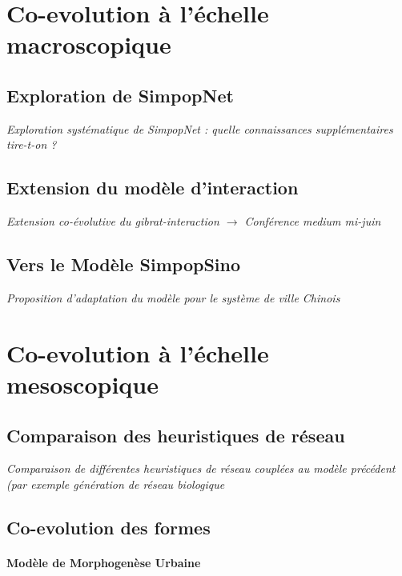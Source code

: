 \section{Co-evolution à l'échelle macroscopique}

\subsection{Exploration de SimpopNet}

\textit{Exploration systématique de SimpopNet : quelle connaissances supplémentaires tire-t-on ?}

\subsection{Extension du modèle d'interaction}


\textit{Extension co-évolutive du gibrat-interaction $\rightarrow$ Conférence medium mi-juin}


\subsection{Vers le Modèle SimpopSino}

\textit{Proposition d'adaptation du modèle pour le système de ville Chinois}





\section{Co-evolution à l'échelle mesoscopique}


\subsection{Comparaison des heuristiques de réseau}

\textit{Comparaison de différentes heuristiques de réseau couplées au modèle précédent (par exemple génération de réseau biologique \cite{raimbault2015labex}}



\subsection{Co-evolution des formes}

\paragraph{Modèle de Morphogenèse Urbaine}


